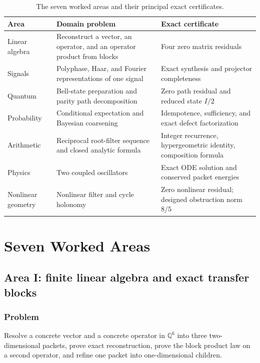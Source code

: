 \documentclass[11pt,oneside]{book}
\theoremstyle{definition}
\theoremstyle{remark}
\newcommand{\Q}{\mathbb Q}
\begin{document}
\begin{table}[H]
\centering
\caption{The seven worked areas and their principal exact certificates.}
\begin{tabularx}{\linewidth}{L{1.45in}Y Y}
\toprule
Area & Domain problem & Exact certificate \\
\midrule
Linear algebra & Reconstruct a vector, an operator, and an operator product from blocks & Four zero matrix residuals \\
Signals & Polyphase, Haar, and Fourier representations of one signal & Exact synthesis and projector completeness \\
Quantum & Bell-state preparation and parity path decomposition & Zero path residual and reduced state $I/2$ \\
Probability & Conditional expectation and Bayesian coarsening & Idempotence, sufficiency, and exact defect factorization \\
Arithmetic & Reciprocal root-filter sequence and closed analytic formula & Integer recurrence, hypergeometric identity, composition formula \\
Physics & Two coupled oscillators & Exact ODE solution and conserved packet energies \\
Nonlinear geometry & Nonlinear filter and cycle holonomy & Zero nonlinear residual; designed obstruction norm $8/5$ \\
\bottomrule
\end{tabularx}
\end{table}



\part{Seven Worked Areas}

\chapter{Area I: finite linear algebra and exact transfer blocks}\label{ch:linear}

\section{Problem}
Resolve a concrete vector and a concrete operator in $\Q^6$ into three two-dimensional packets, prove exact reconstruction, prove the block product law on a second operator, and refine one packet into one-dimensional children.
\end{document}
